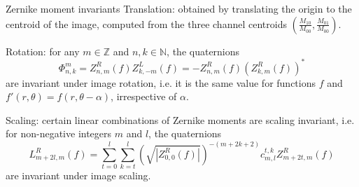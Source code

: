 \documentclass{beamer}
\newcommand{\N}{\mathbb{N}}
\newcommand{\Z}{\mathbb{Z}}
\def\N{{\mathbb N}}
\def\Z{{\mathbb Z}}
\begin{document}
\begin{frame}{Zernike moment invariants}
\vskip 3mm
Translation: obtained by translating the origin to the centroid of the image, computed from the three channel centroids $\left(\frac{M_{10}}{M_{00}},\frac{M_{01}}{M_{00}}\right)$.

Rotation: for any $m\in\Z$ and $n,k\in\N$, the quaternions $$\Phi_{n,k}^m = Z_{n,m}^R(f)Z_{k,-m}^L(f) = -Z_{n,m}^R(f)(Z_{k,m}^R(f))^*$$ are invariant under image rotation, i.e. it is the same value for functions $f$ and $f'(r,\theta) = f(r, \theta - \alpha)$, irrespective of $\alpha$.

Scaling: certain linear combinations of Zernike moments are scaling invariant, i.e. for non-negative integers $m$ and $l$, the quaternions $$L_{m + 2l,m}^R(f) = \sum_{t=0}^l\sum_{k=t}^l\left(\sqrt{|Z_{0,0}^R(f)|}\right)^{-(m+2k+2)}c_{m,l}^{t,k}Z_{m+2t,m}^R(f)$$ are invariant under image scaling.
\end{frame}
\end{document}

